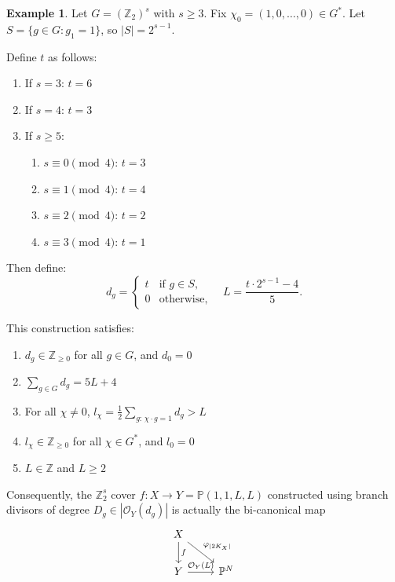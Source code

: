 \documentclass[12pt,twoside,]{amsart}
\theoremstyle{plain}
\theoremstyle{definition}
\newtheorem{example}[theorem]{Example}
\begin{document}
\begin{example}\label{unbounded_non-flat_bicanonical}
Let \( G = (\mathbb{Z}_2)^s \) with \( s \ge 3 \).  
Fix \( \chi_0 = (1,0,\dots,0) \in G^* \).  
Let \( S = \{ g \in G : g_1 = 1 \} \), so \( |S| = 2^{s-1} \).

Define \( t \) as follows:
\begin{enumerate}
    \item If \( s = 3 \): \( t = 6 \)
    \item If \( s = 4 \): \( t = 3 \)
    \item If \( s \ge 5 \):
    \begin{enumerate}
        \item \( s \equiv 0 \pmod{4} \): \( t = 3 \)
        \item \( s \equiv 1 \pmod{4} \): \( t = 4 \)
        \item \( s \equiv 2 \pmod{4} \): \( t = 2 \)
        \item \( s \equiv 3 \pmod{4} \): \( t = 1 \)
    \end{enumerate}
\end{enumerate}

Then define:
\[
d_g = 
\begin{cases}
t & \text{if } g \in S, \\
0 & \text{otherwise},
\end{cases}
\quad
L = \frac{t \cdot 2^{s-1} - 4}{5}.
\]

This construction satisfies:
\begin{enumerate}
    \item \( d_g \in \mathbb{Z}_{\ge 0} \) for all \( g \in G \), and \( d_0 = 0 \)
    \item \( \sum_{g \in G} d_g = 5L + 4 \)
    \item For all \( \chi \ne 0 \), \( l_\chi = \frac12 \sum_{g:\, \chi \cdot g = 1} d_g > L \)
    \item \( l_\chi \in \mathbb{Z}_{\ge 0} \) for all \( \chi \in G^* \), and \( l_0 = 0 \)
    \item \( L \in \mathbb{Z} \) and \( L \ge 2 \)
\end{enumerate}
\end{example}

Consequently, the $\mathbb{Z}_2^s$ cover $f: X \to Y = \mathbb{P}(1,1,L,L)$ constructed using branch divisors of degree $D_g \in |\mathcal{O}_Y(d_g)|$ is actually the bi-canonical map
\[
\begin{tikzcd}
    X \arrow[d, "f"] \arrow[dr, "\varphi_{|2K_X|}"] & \\
    Y \arrow[r, "\mathcal{O}_{Y}(L)"] & \mathbb{P}^N
\end{tikzcd}
\]
\end{document}
